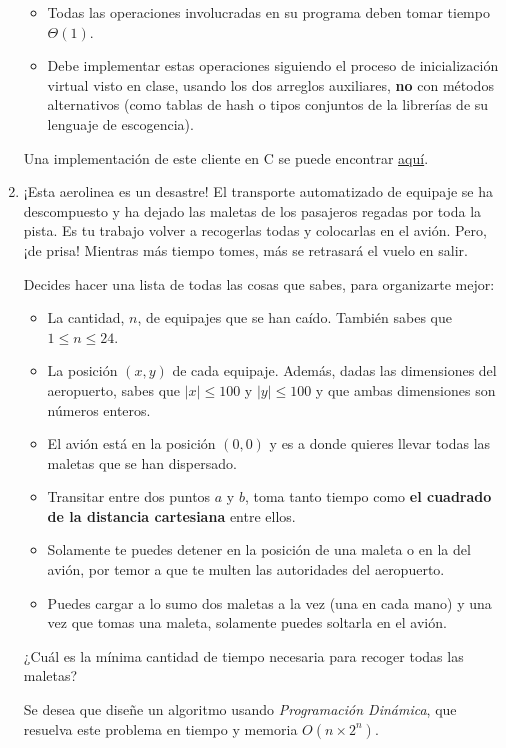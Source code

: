 \documentclass[letterpaper, 12pt]{article}
\begin{document}
\begin{enumerate}
\begin{itemize}
    \item Todas las operaciones involucradas en su programa deben tomar tiempo $\Theta(1)$.

    \item Debe implementar estas operaciones siguiendo el proceso de inicialización virtual visto en clase, usando los dos arreglos auxiliares, \textbf{no} con métodos alternativos (como tablas de hash o tipos conjuntos de la librerías de su lenguaje de escogencia).
\end{itemize}

Una implementación de este cliente en C se puede encontrar \href{https://www.google.com}{aquí}.

\newpage

\item ¡Esta aerolinea es un desastre! El transporte automatizado de equipaje se ha descompuesto y ha dejado las maletas de los pasajeros regadas por toda la pista. Es tu trabajo volver a recogerlas todas y colocarlas en el avión. Pero, ¡de prisa! Mientras más tiempo tomes, más se retrasará el vuelo en salir.

Decides hacer una lista de todas las cosas que sabes, para organizarte mejor:

\begin{itemize}
    \item La cantidad, $n$, de equipajes que se han caído. También sabes que $1 \leq n \leq 24$.

    \item La posición $(x, y)$ de cada equipaje. Además, dadas las dimensiones del aeropuerto, sabes que $|x| \leq 100$ y $|y| \leq 100$ y que ambas dimensiones son números enteros.
    \item El avión está en la posición $(0, 0)$ y es a donde quieres llevar todas las maletas que se han dispersado.
    \item Transitar entre dos puntos $a$ y $b$, toma tanto tiempo como \textbf{el cuadrado de la distancia cartesiana} entre ellos.
    \item Solamente te puedes detener en la posición de una maleta o en la del avión, por temor a que te multen las autoridades del aeropuerto.
    \item Puedes cargar a lo sumo dos maletas a la vez (una en cada mano) y una vez que tomas una maleta, solamente puedes soltarla en el avión.
\end{itemize}

¿Cuál es la mínima cantidad de tiempo necesaria para recoger todas las maletas?

Se desea que diseñe un algoritmo usando \emph{Programación Dinámica}, que resuelva este problema en tiempo y memoria $O(n \times 2^n)$.

\end{enumerate} \vspace{4mm}
\end{document}
